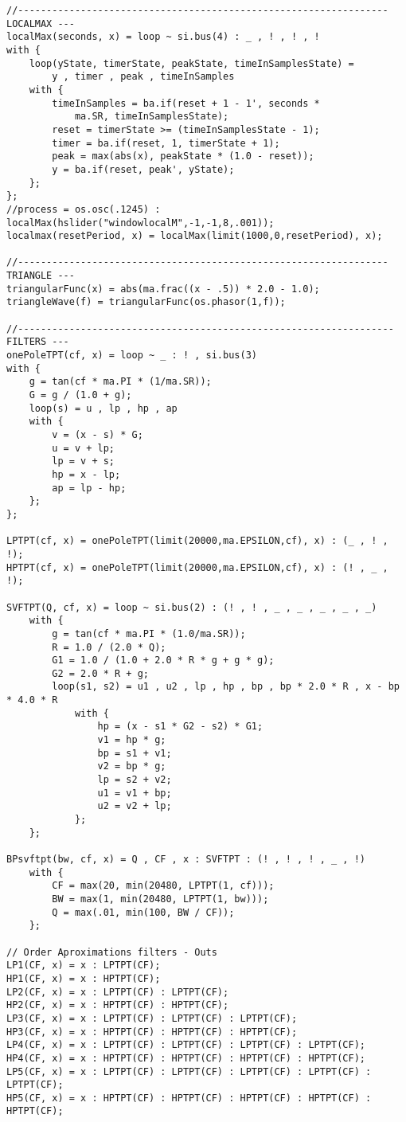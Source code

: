 \begin{lstlisting}
//----------------------------------------------------------------- LOCALMAX ---
localMax(seconds, x) = loop ~ si.bus(4) : _ , ! , ! , !
with {
    loop(yState, timerState, peakState, timeInSamplesState) = 
        y , timer , peak , timeInSamples
    with {
        timeInSamples = ba.if(reset + 1 - 1', seconds * 
            ma.SR, timeInSamplesState);
        reset = timerState >= (timeInSamplesState - 1);
        timer = ba.if(reset, 1, timerState + 1);
        peak = max(abs(x), peakState * (1.0 - reset));
        y = ba.if(reset, peak', yState);
    };
};
//process = os.osc(.1245) : localMax(hslider("windowlocalM",-1,-1,8,.001));
localmax(resetPeriod, x) = localMax(limit(1000,0,resetPeriod), x);

//----------------------------------------------------------------- TRIANGLE ---
triangularFunc(x) = abs(ma.frac((x - .5)) * 2.0 - 1.0);
triangleWave(f) = triangularFunc(os.phasor(1,f));

//------------------------------------------------------------------ FILTERS ---
onePoleTPT(cf, x) = loop ~ _ : ! , si.bus(3)
with {
    g = tan(cf * ma.PI * (1/ma.SR));
    G = g / (1.0 + g);
    loop(s) = u , lp , hp , ap
    with {
        v = (x - s) * G;
        u = v + lp;
        lp = v + s;
        hp = x - lp;
        ap = lp - hp;
    };
};

LPTPT(cf, x) = onePoleTPT(limit(20000,ma.EPSILON,cf), x) : (_ , ! , !);
HPTPT(cf, x) = onePoleTPT(limit(20000,ma.EPSILON,cf), x) : (! , _ , !);

SVFTPT(Q, cf, x) = loop ~ si.bus(2) : (! , ! , _ , _ , _ , _ , _)
    with {
        g = tan(cf * ma.PI * (1.0/ma.SR));
        R = 1.0 / (2.0 * Q);
        G1 = 1.0 / (1.0 + 2.0 * R * g + g * g);
        G2 = 2.0 * R + g;
        loop(s1, s2) = u1 , u2 , lp , hp , bp , bp * 2.0 * R , x - bp * 4.0 * R
            with {
                hp = (x - s1 * G2 - s2) * G1;
                v1 = hp * g;
                bp = s1 + v1;
                v2 = bp * g;
                lp = s2 + v2;
                u1 = v1 + bp;
                u2 = v2 + lp;
            };
    };

BPsvftpt(bw, cf, x) = Q , CF , x : SVFTPT : (! , ! , ! , _ , !)
    with {
        CF = max(20, min(20480, LPTPT(1, cf)));
        BW = max(1, min(20480, LPTPT(1, bw)));
        Q = max(.01, min(100, BW / CF));
    };

// Order Aproximations filters - Outs
LP1(CF, x) = x : LPTPT(CF);
HP1(CF, x) = x : HPTPT(CF);
LP2(CF, x) = x : LPTPT(CF) : LPTPT(CF);
HP2(CF, x) = x : HPTPT(CF) : HPTPT(CF);
LP3(CF, x) = x : LPTPT(CF) : LPTPT(CF) : LPTPT(CF);
HP3(CF, x) = x : HPTPT(CF) : HPTPT(CF) : HPTPT(CF);
LP4(CF, x) = x : LPTPT(CF) : LPTPT(CF) : LPTPT(CF) : LPTPT(CF);
HP4(CF, x) = x : HPTPT(CF) : HPTPT(CF) : HPTPT(CF) : HPTPT(CF);
LP5(CF, x) = x : LPTPT(CF) : LPTPT(CF) : LPTPT(CF) : LPTPT(CF) : LPTPT(CF);
HP5(CF, x) = x : HPTPT(CF) : HPTPT(CF) : HPTPT(CF) : HPTPT(CF) : HPTPT(CF);


\end{lstlisting}
